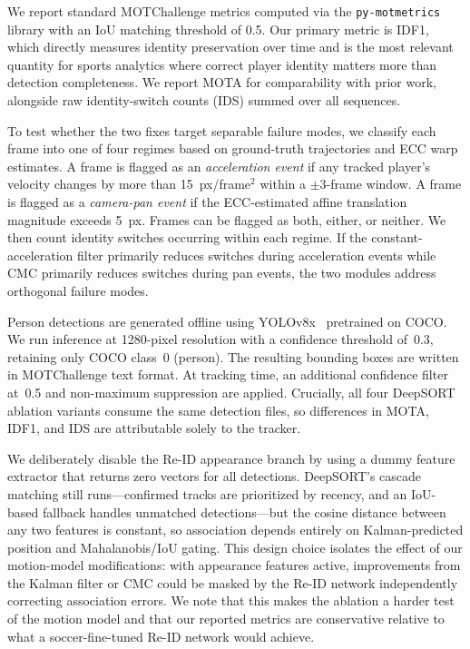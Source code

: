 We report standard MOTChallenge metrics computed via the
\texttt{py-motmetrics} library with an IoU matching threshold of 0.5. Our
primary metric is IDF1, which directly measures identity preservation over
time and is the most relevant quantity for sports analytics where correct
player identity matters more than detection completeness. We report MOTA for
comparability with prior work, alongside raw identity-switch counts (IDS)
summed over all sequences.

To test whether the two fixes target separable failure modes, we classify
each frame into one of four regimes based on ground-truth trajectories and
ECC warp estimates. A frame is flagged as an \emph{acceleration event} if
any tracked player's velocity changes by more than 15~px/frame$^2$ within a
$\pm 3$-frame window. A frame is flagged as a \emph{camera-pan event} if the
ECC-estimated affine translation magnitude exceeds 5~px. Frames can be
flagged as both, either, or neither. We then count identity switches
occurring within each regime. If the constant-acceleration filter primarily
reduces switches during acceleration events while CMC primarily reduces
switches during pan events, the two modules address orthogonal failure
modes.


Person detections are generated offline using
YOLOv8x~\cite{jocher2023yolov8} pretrained on COCO. We run inference at
1280-pixel resolution with a confidence threshold of~0.3, retaining only
COCO class~0 (person). The resulting bounding boxes are written in
MOTChallenge text format. At tracking time, an additional confidence filter
at~0.5 and non-maximum suppression are applied. Crucially, all four
DeepSORT ablation variants consume the same detection files, so differences
in MOTA, IDF1, and IDS are attributable solely to the tracker.

We deliberately disable the Re-ID appearance branch by using a dummy
feature extractor that returns zero vectors for all detections. DeepSORT's
cascade matching still runs---confirmed tracks are prioritized by recency,
and an IoU-based fallback handles unmatched detections---but the cosine
distance between any two features is constant, so association depends
entirely on Kalman-predicted position and Mahalanobis/IoU gating. This
design choice isolates the effect of our motion-model modifications: with
appearance features active, improvements from the Kalman filter or CMC could
be masked by the Re-ID network independently correcting association errors.
We note that this makes the ablation a harder test of the motion model and
that our reported metrics are conservative relative to what a
soccer-fine-tuned Re-ID network would achieve.

